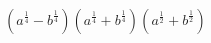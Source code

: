 $(a^{\frac{1}{4}}-b^{\frac{1}{4}})(a^{\frac{1}{4}}+b^{\frac{1}{4}})(a^{\frac{1}{2}}+b^{\frac{1}{2}})$
